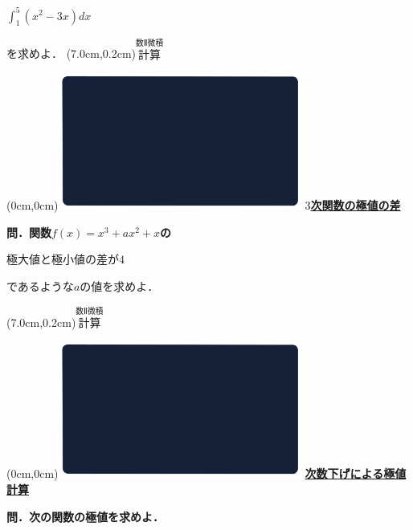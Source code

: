 \documentclass[10pt,
fleqn,
dvipdfmx,
uplatex
]{jsarticle}
\begin{document}
\Huge 
\vspace{-0.2zw}
\hspace{0.2zw}$\displaystyle\int_1^5\left(x^2-3x\right)dx$
\vspace{-0.5zw}

\large
\hfill を求めよ．
\at(7.0cm,0.2cm){\small\color{bradorange}$\overset{\text{数Ⅱ微積}}{\text{計算}}$}

\newpage

\at(0cm,0cm){\includegraphics[width=8cm,bb=0 0 1920 1080]{./youtube/thumbnails/templates/smart_background/数II微積.jpeg}}
{\color{orange}\bf\boldmath\LARGE\underline{$3$次関数の極値の差}}\vspace{0.5zw}

\large 
\bf\boldmath 問．関数$f\left(x\right)=x^3+ax^2+x$の

\huge
\vspace{0.5zw}
\hspace{0.1zw}極大値と極小値の差が$4$

\vspace{0.7zw}
\large 
\hfill であるような$a$の値を求めよ．

\at(7.0cm,0.2cm){\small\color{bradorange}$\overset{\text{数Ⅱ微積}}{\text{計算}}$}

\newpage

\at(0cm,0cm){\includegraphics[width=8cm,bb=0 0 1920 1080]{./youtube/thumbnails/templates/smart_background/数II微積.jpeg}}
{\color{orange}\bf\boldmath\LARGE\underline{次数下げによる極値計算}}\vspace{0.3zw}

\Large 
\bf\boldmath 問．次の関数の極値を求めよ．
\end{document}
